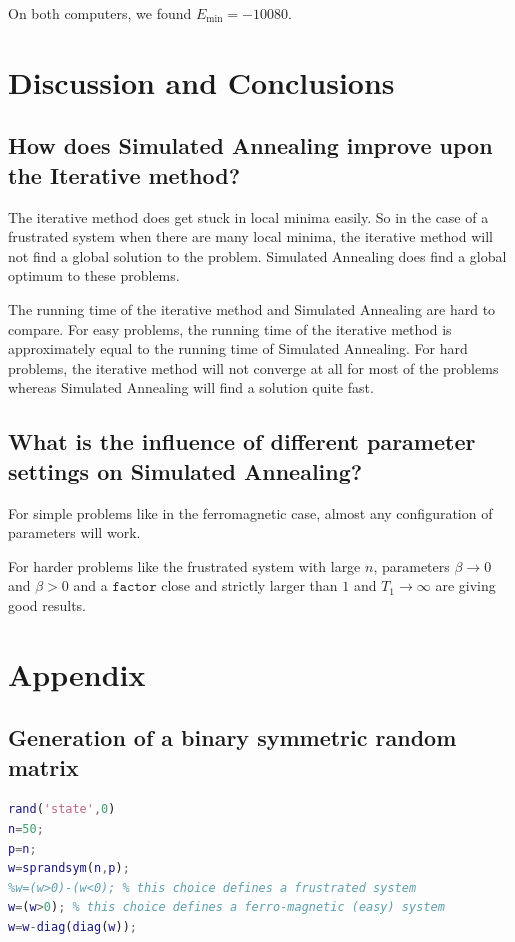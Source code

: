 \documentclass[10pt,a4paper]{article}
\begin{document}
On both computers, we found $E_{\min} = -10080$.

\section{Discussion and Conclusions}

\subsection{How does Simulated Annealing improve upon the Iterative method?}
The iterative method does get stuck in local minima easily. So in the case of a frustrated system when there are many local minima, the iterative method will not find a global solution to the problem. Simulated Annealing does find a global optimum to these problems.

The running time of the iterative method and Simulated Annealing are hard to compare. For easy problems, the running time of the iterative method is approximately equal to the running time of Simulated Annealing. For hard problems, the iterative method will not converge at all for most of the problems whereas Simulated Annealing will find a solution quite fast.

\subsection{What is the influence of different parameter settings on Simulated Annealing?}
For simple problems like in the ferromagnetic case, almost any configuration of parameters will work.

For harder problems like the frustrated system with large $n$, parameters $\beta \rightarrow 0$ and $\beta > 0$ and a $\texttt{factor}$ close and strictly larger than $1$ and $T_1 \rightarrow \infty$ are giving good results.

\newpage
\section{Appendix}

\subsection{Generation of a binary symmetric random matrix}
\begin{lstlisting}[language=Matlab]
rand('state',0)
n=50;
p=n;
w=sprandsym(n,p);
%w=(w>0)-(w<0); % this choice defines a frustrated system
w=(w>0); % this choice defines a ferro-magnetic (easy) system
w=w-diag(diag(w));
\end{lstlisting}
\end{document}
